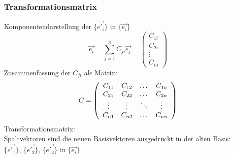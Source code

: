\documentclass{article}
\begin{document}
\subsubsection{Transformationsmatrix}
Komponentendarstellung der $\{\vec{e'_i}\}$ in $\{ \vec{e_i} \}$
\begin{equation*}
    \vec{e_i} = \sum_{j=1}^{n}C_{ji}\vec{e_j}=\left(\begin{array}{c}C_{1i}\\C_{2i}\\\vdots\\C_{ni}\end{array}\right)
\end{equation*}
Zusammenfassung der $C_{ji}$ als Matrix:
\begin{equation*}
    C = \left(\begin{array}{c c c c}
        C_{11}&C_{12}&\dots&C_{1n}\\
        C_{21}&C_{22}&\dots&C_{2n}\\
        \vdots&\vdots&\ddots&\vdots\\
        C_{n1}&C_{n2}&\dots&C_{nn}\\
    \end{array}\right)
\end{equation*}
Transformationsmatrix:\\
Spaltvektoren sind die neuen Basisvektoren ausgedrückt in der alten Basis:\\
$\{\vec{e'_1}\}$, $\{\vec{e'_2}\}$, $\{\vec{e'_3}\}$ in $\{\vec{e_i}\}$
\end{document}
